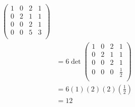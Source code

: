 \documentclass{eh-homework}
\begin{document}
\begin{question}{1}
\begin{align*}
\begin{pmatrix}
                1 & 0 & 2 &  1 \\
                0 & 2 & 1 &  1 \\
                0 & 0 & 2 &  1 \\
                0 & 0 & 5 &  3 \\
            \end{pmatrix} \\
            &= 6\det \begin{pmatrix}
                1 & 0 & 2 &  1 \\
                0 & 2 & 1 &  1 \\
                0 & 0 & 2 &  1 \\
                0 & 0 & 0 &  \frac{1}{2} \\
            \end{pmatrix} \\
            &= 6(1)(2)(2)\left(\frac{1}{2}\right) \\
            &= 12
    \end{align*}
    \end{question}
    \newpage
\end{document}
